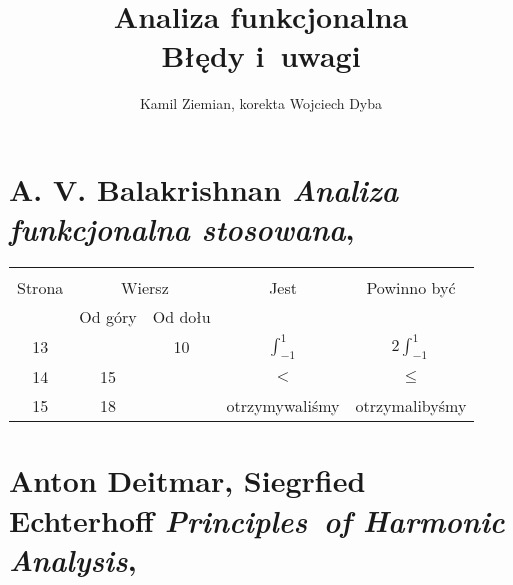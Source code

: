 \documentclass[a4paper,11pt]{article}
\title{Analiza funkcjonalna \\
  {\Large Błędy i~uwagi}}
\author{Kamil Ziemian, korekta Wojciech Dyba}
\begin{document}





\maketitle





\section{A. V. Balakrishnan
  \textit{Analiza funkcjonalna stosowana},
  \cite{BalakrishnanAnalizaFunkcjonalnaStosowana1992}}






\begin{center}

  \begin{tabular}{|c|c|c|c|c|}
    \hline
    & \multicolumn{2}{c|}{} & & \\
    Strona & \multicolumn{2}{c|}{Wiersz} & Jest
                              & Powinno być \\ \cline{2-3}
    & Od góry & Od dołu & & \\
    \hline
    13  & & 10 & $\int^{ 1 }_{ -1 }$ & $2 \int^{ 1 }_{ -1 }$ \\
    14  & 15 & & $<$ & $\leq$ \\
    15  & 18 & & otrzymywaliśmy & otrzymalibyśmy \\
    \hline
  \end{tabular}

\end{center}

\VerSpaceSix













\section{Anton Deitmar, Siegrfied Echterhoff
  \textit{Principles~of Harmonic Analysis},
  \cite{DeitmarEcherhoffPrinciplesOfHarmonicAnalysis2009}}
\end{document}
